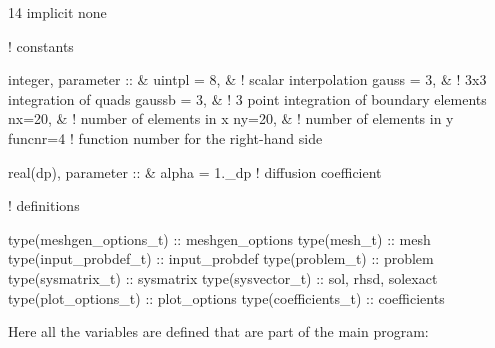 \begin{listing}{14}
  implicit none


! constants

  integer, parameter :: &
    uintpl = 8,         & ! scalar interpolation
    gauss = 3,          & ! 3x3 integration of quads
    gaussb = 3,         & ! 3 point integration of boundary elements
    nx=20,              & ! number of elements in x
    ny=20,              & ! number of elements in y
    funcnr=4              ! function number for the right-hand side

  real(dp), parameter :: &
    alpha = 1._dp     ! diffusion coefficient


! definitions

  type(meshgen_options_t) :: meshgen_options
  type(mesh_t) :: mesh
  type(input_probdef_t) :: input_probdef
  type(problem_t) :: problem
  type(sysmatrix_t) :: sysmatrix
  type(sysvector_t) :: sol, rhsd, solexact
  type(plot_options_t) :: plot_options
  type(coefficients_t) :: coefficients

\end{listing}
Here all the variables are defined that are part of the main program:
